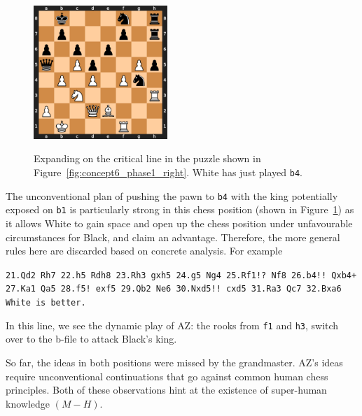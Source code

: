 \documentclass{article}
\newcommand{\ct}[1]{\texttt{#1}}
\begin{document}
\begin{figure}[!ht]
\caption{Expanding on the critical line in the puzzle shown in Figure~\ref{fig:concept6_phase1_right}. White has just played \ct{b4}.}
\centering
\includegraphics[width=0.45\textwidth]{chess_positions/qd2_b4.png} \\ 
\label{fig:qd2_b4}
\end{figure}

The unconventional plan of pushing the pawn to \ct{b4} with the king potentially exposed on \ct{b1} is particularly strong in this chess position (shown in Figure~\ref{fig:qd2_b4}) as it allows White to gain space and open up the chess position under unfavourable circumstances for Black, and claim an advantage. Therefore, the more general rules here are discarded based on concrete analysis. For example 
\begin{displayquote}
\ct{21.Qd2 Rh7 22.h5 Rdh8 23.Rh3 gxh5 24.g5 Ng4 25.Rf1!?~Nf8 26.b4!!~Qxb4+ 27.Ka1 Qa5 28.f5!~exf5 29.Qb2 Ne6 30.Nxd5!!~cxd5 31.Ra3 Qc7 32.Bxa6 White is better.}
\end{displayquote}
In this line, we see the dynamic play of AZ: the rooks from \ct{f1} and \ct{h3}, switch over to the b-file to attack Black's king. 

So far, the ideas in both positions were missed by the grandmaster. AZ's ideas require unconventional continuations that go against common human chess principles. Both of these observations hint at the existence of super-human knowledge $(M-H)$.  
\end{document}
